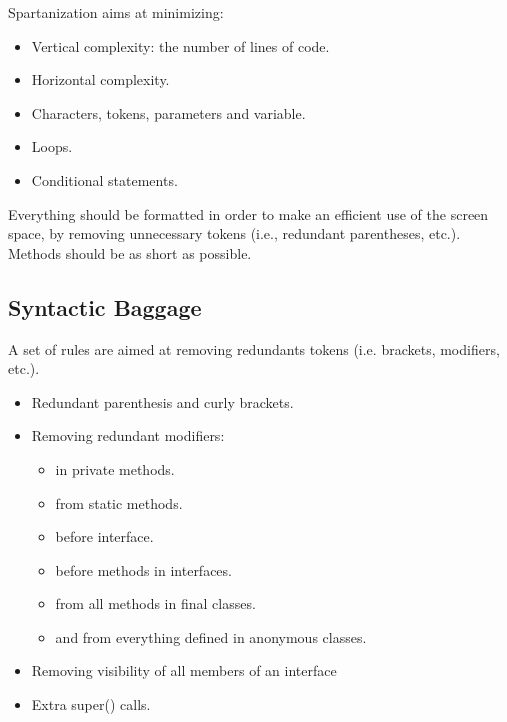 Spartanization aims at minimizing:
\begin{itemize}
 \item Vertical complexity: the number of lines of code.
 \item Horizontal complexity.
 \item Characters, tokens, parameters and variable.
 \item Loops.
 \item Conditional statements.
\end{itemize}



Everything should be formatted in order to make an efficient use of the screen space,
by removing unnecessary tokens (i.e., redundant parentheses, etc.).
Methods should be as short as possible.

\subsection{Syntactic Baggage}
A set of rules are aimed at removing redundants tokens (i.e. brackets, modifiers, etc.).
\begin{itemize}
  \item Redundant parenthesis and curly brackets.
  \item Removing redundant modifiers:
  \begin{itemize}
    \item {} in private methods.
    \item {} from static methods.
    \item {} before interface.
    \item {} before methods in interfaces.
    \item {} from all methods in final classes.
    \item {} and  from everything defined in anonymous classes.
  \end{itemize}
  \item Removing visibility of all members of an interface
  \item Extra super() calls.
\end{itemize}


